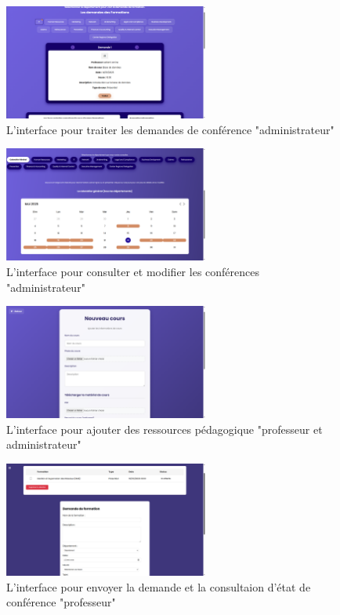 \documentclass{article}
\begin{document}
\begin{figure}[H]
  \centering
  \includegraphics[width=0.6\textwidth]{dem.png}
  \caption{L'interface pour traiter les demandes de conférence "administrateur"}
  \label{fig:traitment}
\end{figure}

\begin{figure}[H]
  \centering
  \includegraphics[width=0.6\textwidth]{modconsfor.png}
  \caption{L'interface pour consulter et modifier les conférences "administrateur"}
  \label{fig:modsup}
\end{figure}




\begin{figure}[H]
  \centering
  \includegraphics[width=0.6\textwidth]{creacou.png}
  \caption{L'interface pour ajouter des ressources pédagogique "professeur et administrateur"}
  \label{fig:ressource}
\end{figure}


\begin{figure}[H]
  \centering
  \includegraphics[width=0.6\textwidth]{planiconf.png}
  \caption{L'interface pour envoyer la demande et la consultaion d'état de conférence "professeur"}
  \label{fig:planif}
\end{figure}
\end{document}
